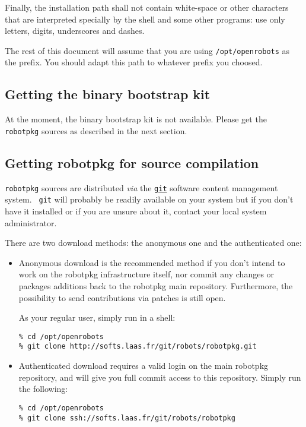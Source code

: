 Finally,  the  installation  path   shall  not  contain  white-space  or  other
characters that are interpreted specially by the shell and some other programs:
use only letters, digits, underscores and dashes.

The rest of this document will  assume that you are using {\tt /opt/openrobots}
as the prefix. You should adapt this path to whatever prefix you choosed.


\subsection{Getting the binary bootstrap kit}

At the moment, the  binary bootstrap kit is not  available. Please get the {\tt
robotpkg} sources as described in the next section.


\subsection{Getting robotpkg for source compilation}

{\tt         robotpkg}    sources   are       distributed     {\em    via}  the
\href{http://git-scm.com/}{\tt git}  software  content management system.  {\tt
git} will probably be readily available on your system but if you don't have it
installed   or if you    are  unsure  about it,   contact  your  local   system
administrator.

There are two download methods: the anonymous one and the authenticated
one:

\begin{itemize}

  \item  Anonymous download is the  recommended method if  you  don't intend to
  work on  the   robotpkg infrastructure  itself,  nor commit   any  changes or
  packages  additions  back to  the  robotpkg main repository. Furthermore, the
  possibility to send contributions via patches is still open.

  As your regular user, simply run in a shell:

\begin{verbatim}
% cd /opt/openrobots
% git clone http://softs.laas.fr/git/robots/robotpkg.git
\end{verbatim}


  \item Authenticated   download requires a  valid  login on the  main robotpkg
  repository, and will give you full commit access  to this repository.  Simply
  run the following:

\begin{verbatim}
% cd /opt/openrobots
% git clone ssh://softs.laas.fr/git/robots/robotpkg
\end{verbatim}

\end{itemize}


